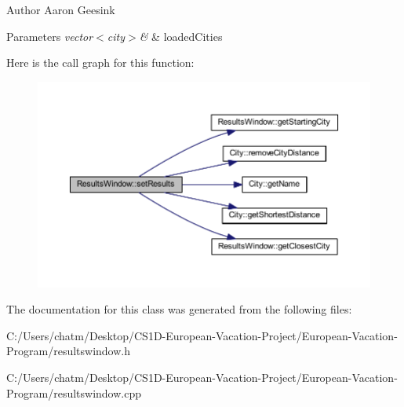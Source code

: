 \begin{DoxyAuthor}{Author}
Aaron Geesink 
\end{DoxyAuthor}

\begin{DoxyParams}{Parameters}
{\em vector$<$city$>$\&} & loaded\+Cities \\
\hline
\end{DoxyParams}
Here is the call graph for this function\+:
\nopagebreak
\begin{figure}[H]
\begin{center}
\leavevmode
\includegraphics[width=350pt]{class_results_window_ab8b52e8d3719ffe9dc789ab9a4507906_cgraph}
\end{center}
\end{figure}


The documentation for this class was generated from the following files\+:\begin{DoxyCompactItemize}
\item 
C\+:/\+Users/chatm/\+Desktop/\+C\+S1\+D-\/\+European-\/\+Vacation-\/\+Project/\+European-\/\+Vacation-\/\+Program/resultswindow.\+h\item 
C\+:/\+Users/chatm/\+Desktop/\+C\+S1\+D-\/\+European-\/\+Vacation-\/\+Project/\+European-\/\+Vacation-\/\+Program/resultswindow.\+cpp\end{DoxyCompactItemize}
